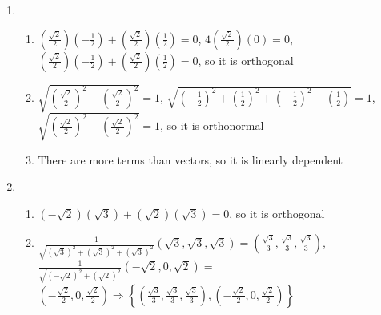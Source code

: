 \documentclass[12pt]{article}
\begin{document}
\begin{enumerate}
\begin{enumerate}
    \end{enumerate}

    \setcounter{enumi}{10}

  \item

    \begin{enumerate}

      \item $\left(\frac{\sqrt{2}}{2}\right)\left( -\frac{1}{2} \right)+\left( \frac{\sqrt{2}}{2} \right)\left( \frac{1}{2} \right)=0$, $4\left( \frac{\sqrt{2}}{2} \right)\left( 0 \right)=0$, $\left(\frac{\sqrt{2}}{2}\right)\left( -\frac{1}{2} \right)+\left( \frac{\sqrt{2}}{2} \right)\left( \frac{1}{2} \right)=0$, so it is orthogonal

      \item $\sqrt{\left( \frac{\sqrt{2}}{2} \right)^2+\left( \frac{\sqrt{2}}{2} \right)^2}=1$, $\sqrt{\left( -\frac{1}{2} \right)^2+\left( \frac{1}{2} \right)^2+\left( -\frac{1}{2} \right)^2+\left( \frac{1}{2} \right)}=1$, $\sqrt{\left( \frac{\sqrt{2}}{2} \right)^2+\left( \frac{\sqrt{2}}{2} \right)^2}=1$, so it is orthonormal

      \item There are more terms than vectors, so it is linearly dependent

    \end{enumerate}

    \setcounter{enumi}{14}

  \item

    \begin{enumerate}

      \item $(-\sqrt{2})(\sqrt{3})+(\sqrt{2})(\sqrt{3})=0$, so it is orthogonal

      \item $\frac{1}{\sqrt{(\sqrt{3})^2+(\sqrt{3})^2+(\sqrt{3})^2}}(\sqrt{3},\sqrt{3},\sqrt{3})=\left( \frac{\sqrt{3}}{3},\frac{\sqrt{3}}{3},\frac{\sqrt{3}}{3} \right)$, $\frac{1}{\sqrt{\left( -\sqrt{2} \right)^2+\left( \sqrt{2} \right)^2}}(-\sqrt{2},0,\sqrt{2})=$\\$\left( -\frac{\sqrt{2}}{2},0,\frac{\sqrt{2}}{2} \right)\Rightarrow\left\{ \left(\frac{\sqrt{3}}{3},\frac{\sqrt{3}}{3},\frac{\sqrt{3}}{3}\right),\left( -\frac{\sqrt{2}}{2},0,\frac{\sqrt{2}}{2} \right) \right\}$

    \end{enumerate}

    \setcounter{enumi}{16}


\end{enumerate}
\end{document}
